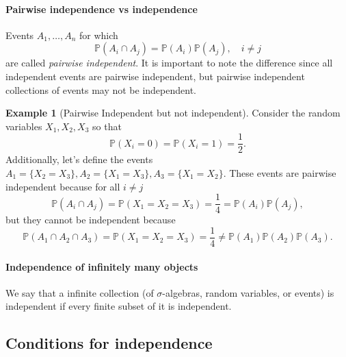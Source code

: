 \documentclass[12pt]{article}
\newcommand{\Prob}{\mathbb{P}}
\theoremstyle{definition}
\newtheorem{exmp}[thm]{Example}
\theoremstyle{remark}
\numberwithin{equation}{section}
\begin{document}
\paragraph{Pairwise independence vs independence}%
\label{par:pairwise_independence_vs_independence}

Events $A_1, \ldots, A_n$ for which 
\begin{equation}
  \Prob(A_i \cap A_j) = \Prob(A_i) \Prob(A_j), \quad i\neq j
\end{equation}
are called \emph{pairwise independent}. It is important to note the difference since all independent events are pairwise independent, but pairwise independent collections of events may not be independent.

\begin{exmp}[Pairwise Independent but not independent]

  Consider the random variables $X_1, X_2, X_3$ so that
  \begin{equation}
    \Prob(X_i = 0) = \Prob(X_i = 1) = \frac{1}{2}.
  \end{equation}
  Additionally, let's define the events $A_1 = \{X_2 = X_3\}, A_2 = \{X_1 = X_3\}, A_3 = \{X_1 = X_2\}$. These events are pairwise independent because for all $i\neq j$
  \begin{equation}
    \Prob(A_i \cap A_j) = \Prob( X_1 = X_2 = X_3 ) = \frac{1}{4} = \Prob(A_i)\Prob(A_j),
  \end{equation}
  but they cannot be independent because 
  \begin{equation}
    \Prob(A_1 \cap A_2 \cap A_3) = \Prob(X_1 = X_2 = X_3) = \frac{1}{4} \neq \Prob(A_1)\Prob(A_2)\Prob(A_3).
  \end{equation}
\end{exmp}

\paragraph{Independence of infinitely many objects}%
\label{par:independence_of_infinitely_many_objects}
We say that a infinite collection (of $\sigma$-algebras, random variables, or events) is independent if every finite subset of it is independent.

\subsection{Conditions for independence}%
\label{sub:conditions_for_independence}
\end{document}
